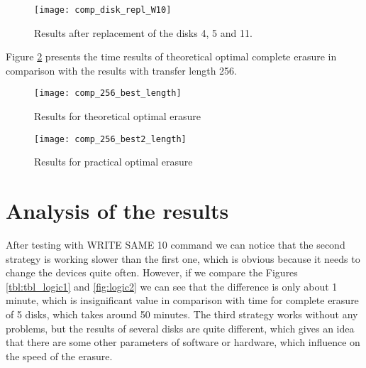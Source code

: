 \begin{figure}[h!]
\begin{center}
  \texttt{[image: comp\_disk\_repl\_W10]}
\end{center}
  \caption{Results after replacement of the disks 4, 5 and 11.}
  \label{fig:comp_disk_repl_W10}
\end{figure}


\newpage
Figure \ref{fig:comp_256_best_length} presents the time results of theoretical optimal complete erasure in comparison with the results with transfer length 256.
\begin{figure}[h!]
\begin{center}
  \texttt{[image: comp\_256\_best\_length]}
\end{center}
  \caption{Results for theoretical optimal erasure}
  \label{fig:comp_256_best_length}
\end{figure}

\begin{figure}[h!]
\begin{center}
  \texttt{[image: comp\_256\_best2\_length]}
\end{center}
  \caption{Results for practical optimal erasure}
  \label{fig:comp_256_best2_length}
\end{figure}



\newpage
\section{Analysis of the results}

After testing with WRITE SAME 10 command we can notice that the second strategy is working slower than the first one, which is obvious because it needs to change the devices quite often. However, if we compare the Figures \ref{tbl:tbl_logic1} and \ref{fig:logic2} we can see that the difference is only about 1 minute, which is insignificant value in comparison with time for complete erasure of 5 disks, which takes around 50 minutes. The third strategy works without any problems, but the results of several disks are quite different, which gives an idea that there are some other parameters of software or hardware, which influence on the speed of the erasure.

